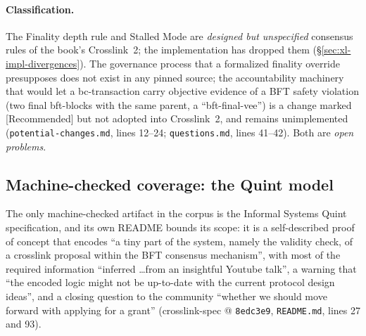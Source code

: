 \documentclass[11pt,a4paper]{article}
\theoremstyle{definition}
\begin{document}
\paragraph{Classification.} The Finality depth rule and Stalled Mode are
\emph{designed but unspecified} consensus rules of the book's Crosslink~2;
the implementation has dropped them (\S\ref{sec:xl-impl-divergences}). The
governance process that a formalized finality override presupposes does
not exist in any pinned source; the accountability machinery that would
let a bc-transaction carry objective evidence of a BFT safety violation
(two final bft-blocks with the same parent, a ``bft-final-vee'') is a
change marked [Recommended] but not adopted into Crosslink~2, and remains
unimplemented (\texttt{potential-changes.md}, lines 12--24;
\texttt{questions.md}, lines 41--42). Both are \emph{open problems}.

\subsection{Machine-checked coverage: the Quint model}
\label{sec:xl-quint-coverage}

The only machine-checked artifact in the corpus is the Informal Systems
Quint specification, and its own README bounds its scope: it is a
self-described proof of concept that encodes ``a tiny part of the system,
namely the validity check, of a crosslink proposal within the BFT
consensus mechanism'', with most of the required information ``inferred
\ldots from an insightful Youtube talk'', a warning that ``the encoded
logic might not be up-to-date with the current protocol design ideas'',
and a closing question to the community ``whether we should move forward
with applying for a grant'' (crosslink-spec @ \texttt{8edc3e9},
\texttt{README.md}, lines 27 and 93).
\end{document}
